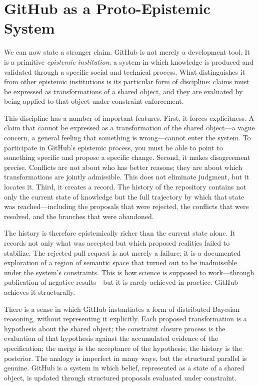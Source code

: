 \documentclass[12pt, letterpaper]{article}
\begin{document}
\section{GitHub as a Proto-Epistemic System}

We can now state a stronger claim. GitHub is not merely a development tool. It is a primitive \emph{epistemic institution}: a system in which knowledge is produced and validated through a specific social and technical process. What distinguishes it from other epistemic institutions is its particular form of discipline: claims must be expressed as transformations of a shared object, and they are evaluated by being applied to that object under constraint enforcement.

This discipline has a number of important features. First, it forces explicitness. A claim that cannot be expressed as a transformation of the shared object---a vague concern, a general feeling that something is wrong---cannot enter the system. To participate in GitHub's epistemic process, you must be able to point to something specific and propose a specific change. Second, it makes disagreement precise. Conflicts are not about who has better reasons; they are about which transformations are jointly admissible. This does not eliminate judgment, but it locates it. Third, it creates a record. The history of the repository contains not only the current state of knowledge but the full trajectory by which that state was reached---including the proposals that were rejected, the conflicts that were resolved, and the branches that were abandoned.

The history is therefore epistemically richer than the current state alone. It records not only what was accepted but which proposed realities failed to stabilize. The rejected pull request is not merely a failure; it is a documented exploration of a region of semantic space that turned out to be inadmissible under the system's constraints. This is how science is supposed to work---through publication of negative results---but it is rarely achieved in practice. GitHub achieves it structurally.

There is a sense in which GitHub instantiates a form of distributed Bayesian reasoning, without representing it explicitly. Each proposed transformation is a hypothesis about the shared object; the constraint closure process is the evaluation of that hypothesis against the accumulated evidence of the specification; the merge is the acceptance of the hypothesis; the history is the posterior. The analogy is imperfect in many ways, but the structural parallel is genuine. GitHub is a system in which belief, represented as a state of a shared object, is updated through structured proposals evaluated under constraint.
\end{document}
